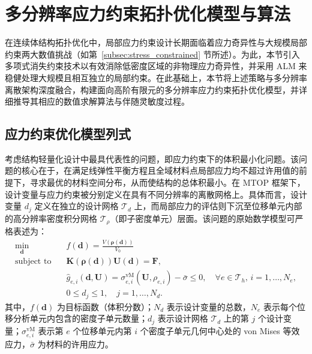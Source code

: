 \section{多分辨率应力约束拓扑优化模型与算法}
\label{sec:ch4_mtop_stress_constraint}

在连续体结构拓扑优化中，局部应力约束设计长期面临着应力奇异性与大规模局部约束两大数值挑战（如第~\ref{subsec:stress_constrained} 节所述）。为此，本节引入多项式消失约束技术以有效消除低密度区域的非物理应力奇异性，并采用 ALM 来稳健处理大规模且相互独立的局部约束。在此基础上，本节将上述策略与多分辨率离散架构深度融合，构建面向高阶有限元的多分辨率应力约束拓扑优化模型，并详细推导其相应的数值求解算法与伴随灵敏度过程。


\subsection{应力约束优化模型列式}
\label{subsec:stress_constraint_model}

考虑结构轻量化设计中最具代表性的问题，即应力约束下的体积最小化问题。该问题的核心在于，在满足线弹性平衡方程且全域材料点局部应力均不超过许用值的前提下，寻求最优的材料空间分布，从而使结构的总体积最小。在 MTOP 框架下，设计变量与应力约束被分别定义在具有不同分辨率的离散网格上。具体而言，设计变量 $d_j$ 定义在独立的设计网格 $\mathcal{T}_d$ 上，而局部应力的评估则下沉至位移单元内部的高分辨率密度积分网格 $\mathcal{T}_\rho$（即子密度单元）层面。该问题的原始数学模型可严格表述为：
\begin{equation} \label{eq:ch4_stress_mtop_model}
	\begin{aligned}
		\min_{\boldsymbol{d}} \quad & f(\boldsymbol{d}) = \frac{V(\boldsymbol{\rho}(\boldsymbol{d}))}{V_0} \\
		\text{subject to} \quad & \boldsymbol{K}(\boldsymbol{\rho}(\boldsymbol{d}))\boldsymbol{U}(\boldsymbol{d}) = \boldsymbol{F}, \\
		& \hat{g}_{e,i}(\boldsymbol{d}, \boldsymbol{U}) = \sigma_{e,i}^{\text{vM}}(\boldsymbol{U}, \rho_{e,i}) - \bar{\sigma} \le 0, \quad \forall e \in \mathcal{T}_h, \, i = 1, \dots, N_e, \\
		& 0 \le d_j \le 1, \quad j = 1, \dots, N_d.
	\end{aligned}
\end{equation}
其中，$f(\boldsymbol{d})$ 为目标函数（体积分数）；$N_d$ 表示设计变量的总数，$N_e$ 表示每个位移分析单元内包含的密度子单元数量；$d_j$ 表示设计网格 $\mathcal{T}_d$ 上的第 $j$ 个设计变量；$\sigma_{e,i}^{\text{vM}}$ 表示第 $e$ 个位移单元内第 $i$ 个密度子单元几何中心处的 von Mises 等效应力，$\bar{\sigma}$ 为材料的许用应力。


